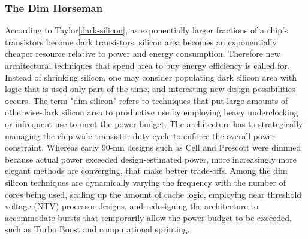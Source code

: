 

\subsubsection{The Dim Horseman}
According to Taylor\ref{dark-silicon}, as exponentially larger fractions of a chip’s transistors become dark transistors, silicon area becomes an exponentially cheaper resource relative to power and energy consumption.
Therefore new architectural techniques that spend area to buy energy efficiency is called for.
Instead of shrinking silicon, one may consider populating dark silicon area with logic that is used only part of the time, and interesting new design possibilities occurs.
The term "dim silicon" refers to techniques that put large amounts of otherwise-dark silicon area to productive use by employing heavy underclocking or infrequent use to meet the power budget.
The architecture has to strategically managing the chip-wide transistor duty cycle to enforce the overall power constraint. 
Whereas early 90-nm designs such as Cell and Prescott were dimmed because actual power exceeded design-estimated power, more increasingly more elegant methods are converging, that make better trade-offs.
Among the dim silicon techniques are dynamically varying the frequency with the number of cores being used, scaling up the amount of cache logic, employing near threshold voltage (NTV) processor designs, and redesigning the architecture to accommodate bursts that temporarily allow the power budget to be exceeded, such as Turbo Boost and computational sprinting.

